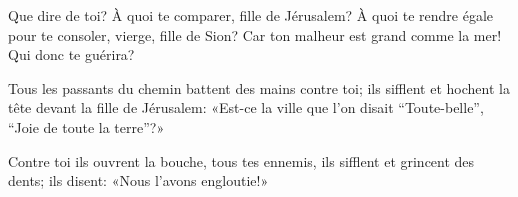 Que dire de toi? À quoi te comparer, fille de Jérusalem? À quoi te rendre égale pour te consoler, vierge, fille de Sion? Car ton malheur est grand comme la mer! Qui donc te guérira?

Tous les passants du chemin battent des mains contre toi; ils sifflent et hochent la tête devant la fille de Jérusalem: «Est-ce la ville que l’on disait “Toute-belle”, “Joie de toute la terre”?»

Contre toi ils ouvrent la bouche, tous tes ennemis, ils sifflent et grincent des dents; ils disent: «Nous l’avons engloutie!»